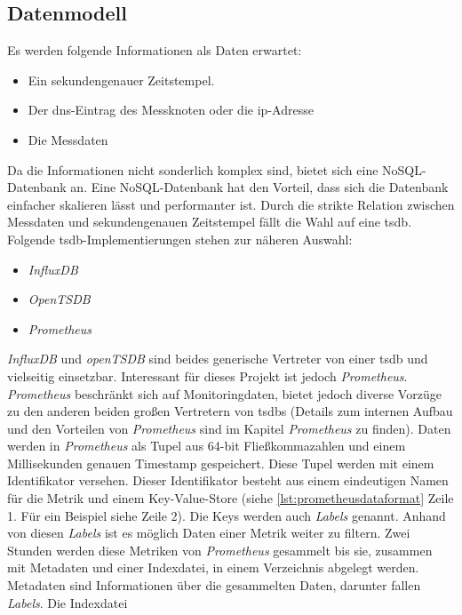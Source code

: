 \documentclass[titlepage]{report}
\begin{document}
\subsection*{Datenmodell}
Es werden folgende Informationen als Daten erwartet:
\begin{itemize}
    \item Ein sekundengenauer Zeitstempel.
    \item Der \gls{dns}\hyp{}Eintrag des Messknoten oder die
        \gls{ip}\hyp{}Adresse
    \item Die Messdaten
\end{itemize}
Da die Informationen nicht sonderlich komplex sind, bietet sich eine
NoSQL\hyp{}Datenbank an. Eine NoSQL\hyp{}Datenbank hat den Vorteil, dass
sich die Datenbank einfacher skalieren lässt und performanter ist. Durch
die strikte Relation zwischen Messdaten und sekundengenauen Zeitstempel
fällt die Wahl auf eine \gls{tsdb}. Folgende
\gls{tsdb}\hyp{}Implementierungen stehen zur näheren Auswahl:
\begin{itemize}
    \item \emph{InfluxDB}\cite{INFLUXDB}
    \item \emph{OpenTSDB}\cite{OPENTSDB}
    \item \emph{Prometheus}\cite{PROMETHEUS}
\end{itemize}
\emph{InfluxDB} und \emph{openTSDB} sind beides generische Vertreter von
einer \gls{tsdb} und vielseitig einsetzbar. Interessant für dieses
Projekt ist jedoch \emph{Prometheus}. \emph{Prometheus} beschränkt sich
auf Monitoringdaten, bietet jedoch diverse Vorzüge zu den anderen beiden
großen Vertretern von \glspl{tsdb} (Details zum internen Aufbau
und den Vorteilen von \emph{Prometheus} sind im Kapitel
\emph{Prometheus} zu finden). Daten werden in \emph{Prometheus} als
Tupel aus 64\hyp{}bit Fließkommazahlen und einem Millisekunden genauen
Timestamp gespeichert\cite{PROMETHEUS_DATA_MODEL}. Diese Tupel werden
mit einem Identifikator versehen. Dieser Identifikator besteht aus
einem eindeutigen Namen für die Metrik und einem
Key\hyp{}Value\hyp{}Store (siehe \autoref{lst:prometheusdataformat} Zeile 1. Für ein
Beispiel siehe Zeile 2). Die Keys werden auch \emph{Labels} genannt.
Anhand von diesen \emph{Labels} ist es möglich Daten einer Metrik weiter
zu filtern. Zwei Stunden werden diese Metriken von \emph{Prometheus}
gesammelt bis sie, zusammen mit Metadaten und einer Indexdatei, in einem
Verzeichnis abgelegt werden. Metadaten sind Informationen über die
gesammelten Daten, darunter fallen \emph{Labels}. Die Indexdatei
\end{document}
